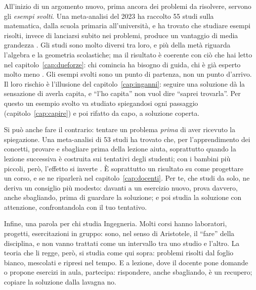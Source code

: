 All'inizio di un argomento nuovo, prima ancora dei problemi da
risolvere, servono gli \emph{esempi svolti}. Una meta-analisi del 2023
ha raccolto 55 studi sulla matematica, dalla scuola primaria
all'università, e ha trovato che studiare esempi risolti, invece di
lanciarsi subito nei problemi, produce un vantaggio di media grandezza
\parencite{barbieri2023}. Gli studi sono molto diversi tra loro, e più
della metà riguarda l'algebra e la geometria scolastiche; ma il
risultato è coerente con ciò che hai letto nel
capitolo~\ref{cap:dueforze}: chi comincia ha bisogno di guida, chi è
già esperto molto meno \parencite{kalyuga2003}. Gli esempi svolti sono
un punto di partenza, non un punto d'arrivo. Il loro rischio è
l'illusione del capitolo~\ref{cap:inganni}: seguire una soluzione dà la
sensazione di averla capita, e \enquote{l'ho capita} non vuol dire
\enquote{saprei trovarla}. Per questo un esempio svolto va studiato
spiegandosi ogni passaggio (capitolo~\ref{cap:capire}) e poi rifatto
da capo, a soluzione coperta.

Si può anche fare il contrario: tentare un problema \emph{prima} di
aver ricevuto la spiegazione. Una meta-analisi di 53 studi ha trovato
che, per l'apprendimento dei concetti, provare e sbagliare prima della
lezione aiuta, soprattutto quando la lezione successiva è costruita sui
tentativi degli studenti;
con i bambini più piccoli, però, l'effetto si inverte
\parencite{sinha2021}. È soprattutto un risultato su come progettare un
corso, e se ne riparlerà nel capitolo~\ref{cap:docenti}. Per te, che
studi da solo, ne deriva un consiglio più modesto: davanti a un
esercizio nuovo, prova davvero, anche sbagliando, prima di guardare la
soluzione; e poi studia la soluzione con attenzione, confrontandola con
il tuo tentativo.

Infine, una parola per chi studia Ingegneria. Molti corsi hanno
laboratori, progetti, esercitazioni in gruppo: sono, nel senso di
Aristotele, il \enquote{fare} della disciplina, e non vanno trattati
come un intervallo tra uno studio e l'altro. La teoria che li regge,
però, si studia come qui sopra: problemi risolti dal foglio bianco,
mescolati e ripresi nel tempo. E a lezione, dove il docente pone
domande o propone esercizi in aula, partecipa: rispondere, anche
sbagliando, è un recupero; copiare la soluzione dalla lavagna no.

